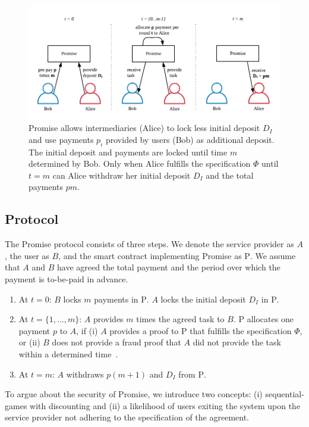 \documentclass[runningheads]{llncs}
\newcommand{\sys}{Promise\xspace}
\begin{document}
\begin{figure}[t!]
    \centering
    \includegraphics[width=\textwidth]{figures/protocol.pdf}
    \caption{\sys allows intermediaries (Alice) to lock less initial deposit $D_I$ and use payments $p_i$ provided by users (Bob) as additional deposit. The initial deposit and payments are locked until time $m$ determined by Bob. Only when Alice fulfills the specification $\Phi$ until $t=m$ can Alice withdraw her initial deposit $D_I$ and the total payments $pm$.}
    \label{fig:promise}
\end{figure}

\subsection{Protocol}

The \sys protocol consists of three steps.
We denote the service provider as $A$, the user as $B$, and the smart contract implementing \sys as $\mathrm{P}$.
We assume that $A$ and $B$ have agreed the total payment and the period over which the payment is to-be-paid in advance.

\begin{enumerate}
    \item At $t=0$: $B$ locks $m$ payments in $\mathrm{P}$. $A$ locks the initial deposit $D_I$ in $\mathrm{P}$.
    \item At $t=\{1, ..., m\}$: $A$ provides $m$ times the agreed task to $B$. $\mathrm{P}$ allocates one payment $p$ to $A$, if (i) $A$ provides a proof to $\mathrm{P}$ that fulfills the specification $\Phi$, or (ii) $B$ does not provide a fraud proof that $A$ did not provide the task within a determined time~\cite{Al-Bassam2018}.
    \item At $t=m$: $A$ withdraws $p(m+1)$ and $D_I$ from $\mathrm{P}$.
\end{enumerate}

To argue about the security of \sys, we introduce two concepts: (i) sequential-games with discounting and (ii) a likelihood of users exiting the system upon the service provider not adhering to the specification of the agreement.
\end{document}
